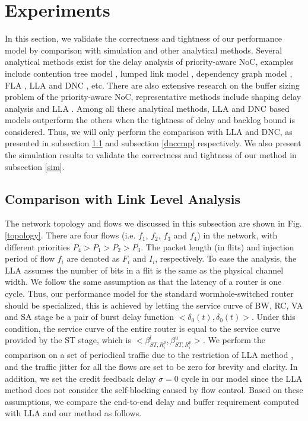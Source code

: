 \documentclass[preprint]{elsarticle}
\begin{document}
\section{Experiments}\label{experiments}
In this section, we validate the correctness and tightness of our performance model by comparison with simulation and other analytical methods. Several analytical methods exist for the delay analysis of priority-aware NoC, examples include contention tree model \cite{LuJS05}, lumped link model \cite{707545}, dependency graph model \cite{708526}, FLA \cite{Shi:2008:RCA:1397757.1397996}, LLA \cite{73} and DNC \cite{Qian489900}, etc. There are also extensive research on the buffer sizing problem of the priority-aware NoC, representative methods include shaping delay analysis \cite{Manolache:2006:BSO:1131481.1131683} and LLA \cite{189}. Among all these analytical methods, LLA \cite{73}\cite{189} and DNC \cite{Qian489900} based models outperform the others when the tightness of delay and backlog bound is considered. Thus, we will only perform the comparison with LLA and DNC, as presented in subsection \ref{llacmp} and subsection \ref{dnccmp} respectively. We also present the simulation results to validate the correctness and tightness of our method in subsection \ref{sim}.

\subsection{Comparison with Link Level Analysis}\label{llacmp}
The network topology and flows we discussed in this subsection are shown in Fig. \ref{topology}. There are four flows (i.e. $f_1$, $f_2$, $f_3$ and $f_4$) in the network, with different priorities $P_4>P_1>P_2>P_3$. The packet length (in flits) and injection period of flow $f_i$ are denoted as $F_i$ and $I_i$, respectively. To ease the analysis, the LLA assumes the number of bits in a flit is the same as the physical channel width. We follow the same assumption as \cite{189} that the latency of a router is one cycle. Thus, our performance model for the standard wormhole-switched router should be specialized, this is achieved by letting the service curve of BW, RC, VA and SA stage be a pair of burst delay function $<\delta_0(t),\delta_0(t)>$. Under this condition, the service curve of the entire router is equal to the service curve provided by the ST stage, which is $<\beta_{ST,R_i^p}^l,\beta_{ST,R_i^p}^u>$. We perform the comparison on a set of periodical traffic due to the restriction of LLA method \cite{73}\cite{189}, and the traffic jitter for all the flows are set to be zero for brevity and clarity. In addition, we set the credit feedback delay $\sigma=0$ cycle in our model since the LLA method does not consider the self-blocking caused by flow control. Based on these assumptions, we compare the end-to-end delay and buffer requirement computed with LLA and our method as follows.
\end{document}
